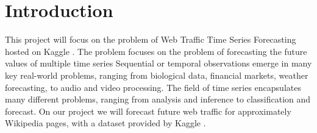 \section{Introduction}

This project will focus on the problem of Web Traffic Time Series Forecasting hosted on Kaggle \cite{kaggle}.
The problem focuses on the problem of forecasting the future values of multiple time series
Sequential or temporal observations emerge in many key real-world problems, ranging from biological data,
financial markets, weather forecasting, to audio and video processing.
The field of time series encapsulates many different problems,
ranging from analysis and inference to classification and forecast.
On our project we will forecast future web traffic for approximately Wikipedia pages,
with a dataset provided by Kaggle \cite{kaggle_data}.


